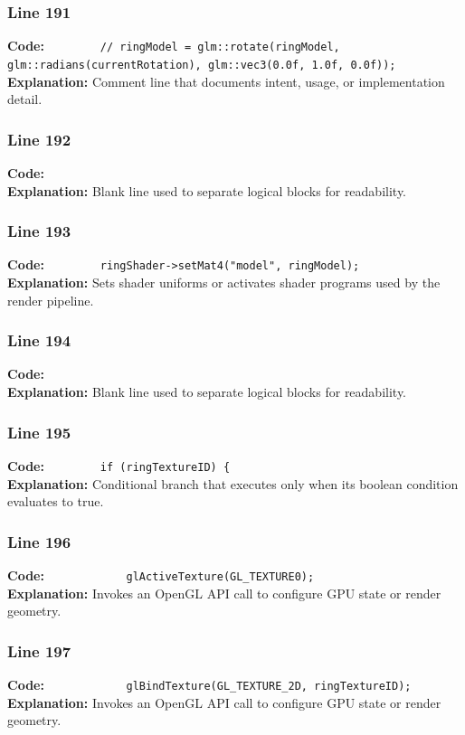 \documentclass[11pt,a4paper]{article}
\begin{document}
\subsubsection*{Line 191}
\textbf{Code:} \verb|        // ringModel = glm::rotate(ringModel, glm::radians(currentRotation), glm::vec3(0.0f, 1.0f, 0.0f));|\\
\textbf{Explanation:} Comment line that documents intent, usage, or implementation detail.

\subsubsection*{Line 192}
\textbf{Code:} \verb|        |\\
\textbf{Explanation:} Blank line used to separate logical blocks for readability.

\subsubsection*{Line 193}
\textbf{Code:} \verb|        ringShader->setMat4("model", ringModel);|\\
\textbf{Explanation:} Sets shader uniforms or activates shader programs used by the render pipeline.

\subsubsection*{Line 194}
\textbf{Code:} \verb|        |\\
\textbf{Explanation:} Blank line used to separate logical blocks for readability.

\subsubsection*{Line 195}
\textbf{Code:} \verb|        if (ringTextureID) {|\\
\textbf{Explanation:} Conditional branch that executes only when its boolean condition evaluates to true.

\subsubsection*{Line 196}
\textbf{Code:} \verb|            glActiveTexture(GL_TEXTURE0);|\\
\textbf{Explanation:} Invokes an OpenGL API call to configure GPU state or render geometry.

\subsubsection*{Line 197}
\textbf{Code:} \verb|            glBindTexture(GL_TEXTURE_2D, ringTextureID);|\\
\textbf{Explanation:} Invokes an OpenGL API call to configure GPU state or render geometry.
\end{document}
